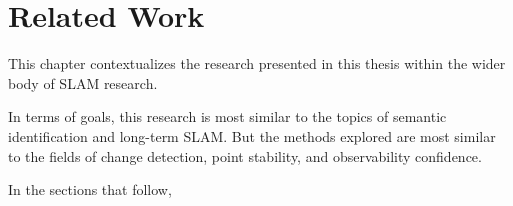 \section{Related Work}
\label{sec:related_work}

This chapter contextualizes the research presented in this thesis within the wider body of SLAM research. 

In terms of goals, this research is most similar to the topics of semantic identification and long-term SLAM. But the methods explored are most similar to the fields of change detection, point stability, and observability confidence.

In the sections that follow,
% 